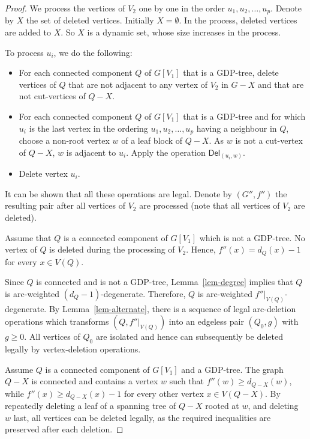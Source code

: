 \documentclass[11pt,a4paper]{article}
\theoremstyle{definition}
\newcommand{\ed}{\textsf{Del}}
\begin{document}
\begin{proof}
We process the vertices of $V_2$ one by one in the order $u_1,u_2, \ldots, u_p$.  Denote by $X$ the set of deleted vertices. Initially $X = \emptyset$. In the process, deleted vertices are added to $X$. So $X$ is a dynamic set, whose size increases in the process.

To process $u_i$, we do the following: 
    \begin{itemize}
    \item For each connected component $Q$ of $G[V_1]$ that is a GDP-tree, delete vertices of $Q$ that are not adjacent to any vertex of $V_2$ in $G-X$ and that are not cut-vertices of $Q-X$.
    \item For each connected component $Q$ of $G[V_1]$ that is a GDP-tree and for which $u_i$ is the last vertex in the ordering $u_1,u_2,\ldots,u_p$ having a neighbour in $Q$, choose a non-root vertex $w$ of a leaf block of $Q-X$. As $w$ is not a cut-vertex of $Q-X$, $w$ is adjacent to   $u_i$. Apply the operation $\ed_{(u_i,w)}$. 
    \item Delete vertex $u_i$.
\end{itemize}

It can be shown that all these operations are legal. Denote by $(G'',f'')$ the resulting pair after all  vertices of $V_2$ are processed (note that all vertices of $V_2$ are deleted).  

Assume that $Q$ is a connected component of $G[V_1]$ which is not
a GDP-tree. No vertex of $Q$ is deleted during the processing of
$V_2$. Hence, $f''(x)=d_Q(x)-1$ for every $x\in V(Q)$.

Since $Q$ is connected and is not a GDP-tree, Lemma~\ref{lem-degree}
implies that $Q$ is arc-weighted $(d_Q-1)$-degenerate. Therefore,
$Q$ is arc-weighted $f''|_{V(Q)}$-degenerate. By
Lemma~\ref{lem-alternate}, there is a sequence of legal arc-deletion
operations which transforms $(Q,f''|_{V(Q)})$ into an edgeless pair $(Q_0,g)$ with $g\ge 0$. All vertices of $Q_0$ are isolated and hence can subsequently be deleted legally by
vertex-deletion operations.

Assume $Q$ is a connected component of $G[V_1]$ and a GDP-tree. The graph $Q-X$ is connected and contains a vertex $w$ such that $f''(w)\ge d_{Q-X}(w)$, while $f''(x)\ge d_{Q-X}(x)-1$ for every other vertex $x\in V(Q-X)$. By repeatedly deleting a leaf of a spanning tree of $Q-X$ rooted at
$w$, and deleting $w$ last, all vertices can be deleted legally, as
the required inequalities are preserved after each deletion. 
\end{proof}
\end{document}
